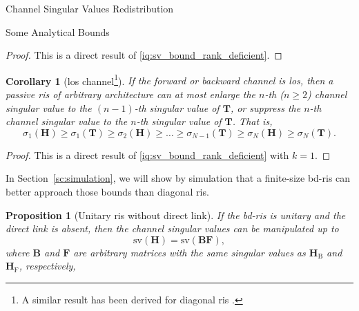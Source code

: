 \documentclass[journal]{IEEEtran}
\newtheorem{proposition}{Proposition}
\newtheorem{corollary}{Corollary}[proposition]
\begin{document}
\begin{section}{Channel Singular Values Redistribution}
\begin{subsection}{Some Analytical Bounds}
		\begin{proof}
			This is a direct result of \eqref{iq:sv_bound_rank_deficient}.
		\end{proof}

		\begin{corollary}[\gls{los} channel\footnote{A similar result has been derived for diagonal \gls{ris} \cite{Semmler2023}.}\label{co:los}]
			If the forward or backward channel is \gls{los}, then a passive \gls{ris} of arbitrary architecture can at most enlarge the $n$-th ($n \ge 2$) channel singular value to the $(n-1)$-th singular value of $\mathbf{T}$, or suppress the $n$-th channel singular value to the $n$-th singular value of $\mathbf{T}$.
			That is,
			\begin{equation}
				\sigma_1(\mathbf{H}) \ge \sigma_1(\mathbf{T}) \ge {\sigma_2(\mathbf{H})} \ge \ldots \ge \sigma_{N-1}(\mathbf{T}) \ge {\sigma_N(\mathbf{H})} \ge \sigma_N(\mathbf{T}).
				\label{iq:sv_bound_los}
			\end{equation}
		\end{corollary}

		\begin{proof}
			This is a direct result of \eqref{iq:sv_bound_rank_deficient} with $k = 1$.
		\end{proof}

		In Section~\ref{sc:simulation}, we will show by simulation that a finite-size \gls{bd}-\gls{ris} can better approach those bounds than diagonal \gls{ris}.

		\begin{proposition}[Unitary \gls{ris} without direct link]\label{pp:fully_connected}
			If the \gls{bd}-\gls{ris} is unitary and the direct link is absent, then the channel singular values can be manipulated up to
			\begin{equation}
				\mathrm{sv}(\mathbf{H}) = \mathrm{sv}(\mathbf{BF}),
			\end{equation}
			where $\mathbf{B}$ and $\mathbf{F}$ are arbitrary matrices with the same singular values as $\mathbf{H}_\mathrm{B}$ and $\mathbf{H}_\mathrm{F}$, respectively,
		\end{proposition}


\end{subsection}
\end{section}
\end{document}
